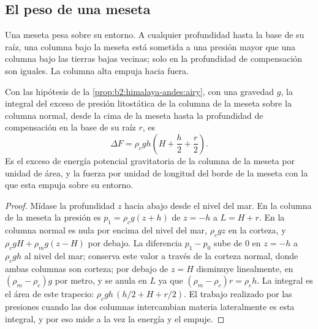 \subsection{El peso de una meseta}

Una meseta pesa sobre su entorno. A cualquier profundidad hasta la base de su raíz, una columna
bajo la meseta está sometida a una presión mayor que una columna bajo las tierras bajas vecinas;
solo en la profundidad de compensación son iguales. La columna alta empuja hacia fuera.

\begin{proposition}\label{prop:b2:himalaya-andes:gpe}
Con las hipótesis de la \cref{prop:b2:himalaya-andes:airy}, con una gravedad $g$, la integral del
exceso de presión litostática de la columna de la meseta sobre la columna normal, desde la cima
de la meseta hasta la profundidad de compensación en la base de su raíz $r$, es
\[
  \Delta F = \rho_c g h \left(H + \frac{h}{2} + \frac{r}{2}\right) .
\]
Es el exceso de energía potencial gravitatoria de la columna de la meseta por unidad de área, y la
fuerza por unidad de longitud del borde de la meseta con la que esta empuja sobre su
entorno.
\end{proposition}

\begin{proof}
Mídase la profundidad $z$ hacia abajo desde el nivel del mar. En la columna de la meseta la presión es $p_1 =
\rho_c g (z + h)$ de $z = -h$ a $L = H + r$. En la columna normal es nula por encima del nivel
del mar, $\rho_c g z$ en la corteza, y $\rho_c g H + \rho_m g (z - H)$ por debajo. La diferencia $p_1
- p_0$ sube de 0 en $z = -h$ a $\rho_c g h$ al nivel del mar; conserva este valor a través de la
corteza normal, donde ambas columnas son corteza; por debajo de $z = H$ disminuye linealmente, en
$(\rho_m - \rho_c) g$ por metro, y se anula en $L$ ya que $(\rho_m - \rho_c) r = \rho_c
h$. La integral es el área de este trapecio: $\rho_c g h\,(h/2 + H + r/2)$. El trabajo realizado por
las presiones cuando las dos columnas intercambian materia lateralmente es esta integral, y por eso
mide a la vez la energía y el empuje.
\end{proof}

